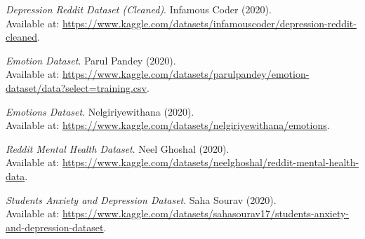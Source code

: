 \documentclass[runningheads,a4paper,11pt]{report}
\begin{document}
\newpage
{} 
\begin{thebibliography}{99}

\textit{Depression Reddit Dataset (Cleaned)}.  
Infamous Coder (2020).  
\\Available at: \url{https://www.kaggle.com/datasets/infamouscoder/depression-reddit-cleaned}.  

\textit{Emotion Dataset}.  
Parul Pandey (2020).  
\\Available at: \url{https://www.kaggle.com/datasets/parulpandey/emotion-dataset/data?select=training.csv}.  

\textit{Emotions Dataset}.  
Nelgiriyewithana (2020).  
\\Available at: \url{https://www.kaggle.com/datasets/nelgiriyewithana/emotions}.  

\textit{Reddit Mental Health Dataset}.  
Neel Ghoshal (2020).  
\\Available at: \url{https://www.kaggle.com/datasets/neelghoshal/reddit-mental-health-data}. 

\textit{Students Anxiety and Depression Dataset}.  
Saha Sourav (2020).  
\\Available at: \url{https://www.kaggle.com/datasets/sahasourav17/students-anxiety-and-depression-dataset}.  

\end{thebibliography}
\end{document}

